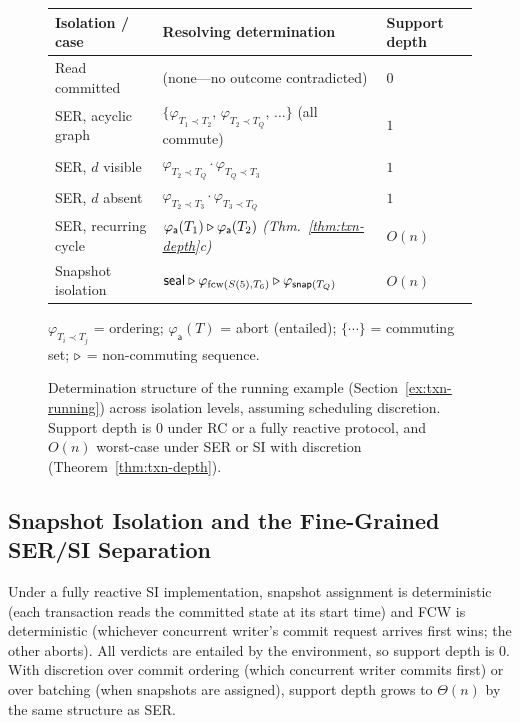 \begin{figure}[t]
  \centering
  \footnotesize
  \setlength{\tabcolsep}{4pt}
  \renewcommand{\arraystretch}{1.15}
  \begin{tabular}{@{}lll@{}}
    \toprule
    \textbf{Isolation / case} & \textbf{Resolving determination} & \textbf{Support depth} \\
    \midrule
    Read committed &
    (none---no outcome contradicted) & $0$ \\
    SER, acyclic graph &
    $\{\varphi_{T_1 \prec T_2},\, \varphi_{T_2 \prec T_Q},\, \ldots\}$ (all commute) & $1$ \\
    SER, $d$ visible &
    $\varphi_{T_2 \prec T_Q} \cdot \varphi_{T_Q \prec T_3}$ & $1$ \\
    SER, $d$ absent &
    $\varphi_{T_2 \prec T_3} \cdot \varphi_{T_3 \prec T_Q}$ & $1$ \\
    SER, recurring cycle &
    $\varphi_{\mathsf{a}}(T_1) \mathbin{\triangleright} \varphi_{\mathsf{a}}(T_2)$
    \;\emph{(Thm.~\ref{thm:txn-depth}c)} & $O(n)$ \\
    Snapshot isolation &
    $\mathsf{seal} \mathbin{\triangleright} \varphi_{\mathrm{fcw}(S(5),T_6)}
      \mathbin{\triangleright} \varphi_{\mathsf{snap}(T_Q)}$ & $O(n)$ \\
    \bottomrule
  \end{tabular}
  \smallskip
  {\footnotesize
    $\varphi_{T_i \prec T_j}$ = ordering;\;
    $\varphi_{\mathsf{a}}(T)$ = abort (entailed);\;
    $\{\cdots\}$ = commuting set;\;
    $\mathbin{\triangleright}$ = non-commuting sequence.}
  \caption{Determination structure of the running example
    (Section~\ref{ex:txn-running}) across isolation levels, assuming scheduling
    discretion. Support depth is $0$ under RC or a fully reactive protocol, and
    $O(n)$ worst-case under SER or SI with discretion
    (Theorem~\ref{thm:txn-depth}).}
  \label{fig:det-tables}
\end{figure}

\subsection{Snapshot Isolation and the Fine-Grained SER/SI Separation}
\label{sec:txn-si}

Under a fully reactive SI implementation, snapshot assignment is deterministic
(each transaction reads the committed state at its start time) and FCW is
deterministic (whichever concurrent writer's commit request arrives first wins;
the other aborts). All verdicts are entailed by the environment, so support
depth is $0$. With discretion over commit ordering (which concurrent writer
commits first) or over batching (when snapshots are assigned), support depth
grows to $\Theta(n)$ by the same structure as SER.

